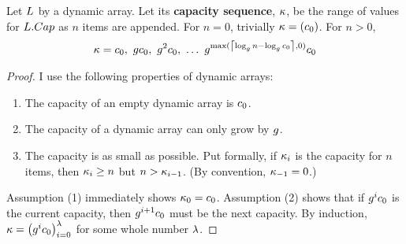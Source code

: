 \begin{lemma}
\label{lem:CapacitySeq}
	Let $L$ by a dynamic array. Let its \textbf{capacity sequence}, $\kappa$, be the range of values for $L.Cap$ as $n$ items are appended. For $n = 0$, trivially $\kappa = (c_0)$. For $n > 0$,
	\begin{align*}
	\VarCapacitySeq = \VarInitCapacity,\ \VarGrowthFactor\VarInitCapacity,\ \VarGrowthFactor^2\VarInitCapacity,\ \ldots\ \VarGrowthFactor^{\max(\ExprMessy, 0)}\VarInitCapacity
	\end{align*}
\end{lemma}

\begin{proof}
	I use the following properties of dynamic arrays:
	\begin{enumerate}
		\item The capacity of an empty dynamic array is $c_0$.
		\item The capacity of a dynamic array can only grow by $g$.
		\item The capacity is as small as possible. Put formally, if $\kappa_i$ is the capacity for $n$ items, then $\kappa_i \geq n$ but $n > \kappa_{i - 1}$. (By convention, $\kappa_{-1} = 0$.)
	\end{enumerate}
	Assumption (1) immediately shows $\kappa_0 = c_0$. Assumption (2) shows that if $g^ic_0$ is the current capacity, then $g^{i + 1}c_0$ must be the next capacity. By induction, $\kappa = \left( g^ic_0 \right)_{i = 0}^\lambda$ for some whole number $\lambda$.
	

\end{proof}
